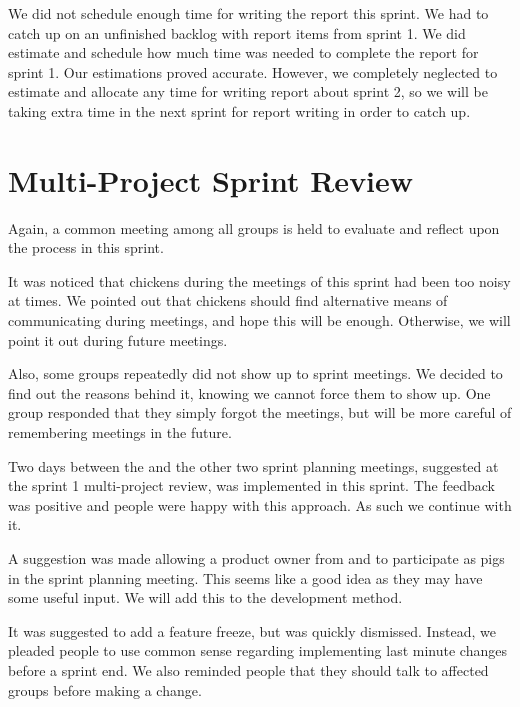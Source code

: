 We did not schedule enough time for writing the report this sprint. We had to catch up on an unfinished backlog with report items from sprint 1. We did estimate and schedule how much time was needed to complete the report for sprint 1. Our estimations proved accurate. However, we completely neglected to estimate and allocate any time for writing report about sprint 2, so we will be taking extra time in the next sprint for report writing in order to catch up.

\section{Multi-Project Sprint Review}\label{sec:s2_multiprj_review}
Again, a common meeting among all groups is held to evaluate and reflect upon the process in this sprint.

It was noticed that chickens during the meetings of this sprint had been too noisy at times. We pointed out that chickens should find alternative means of communicating during meetings, and hope this will be enough. Otherwise, we will point it out during future meetings.

Also, some groups repeatedly did not show up to sprint meetings. We decided to find out the reasons behind it, knowing we cannot force them to show up. One group responded that they simply forgot the meetings, but will be more careful of remembering meetings in the future.

Two days between the \gui and the other two sprint planning meetings, suggested at the sprint 1 multi-project review, was implemented in this sprint. The feedback was positive and people were happy with this approach. As such we continue with it.

A suggestion was made allowing a product owner from \db and \bd to participate as pigs in the \gui sprint planning meeting. This seems like a good idea as they may have some useful input. We will add this to the development method.

It was suggested to add a feature freeze, but was quickly dismissed. Instead, we pleaded people to use common sense regarding implementing last minute changes before a sprint end. We also reminded people that they should talk to affected groups before making a change.